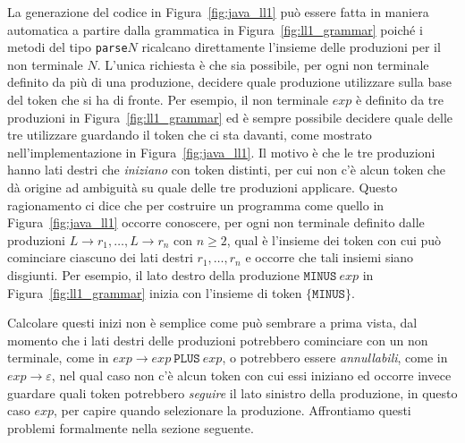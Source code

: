 La generazione del codice in Figura~\ref{fig:java_ll1} pu\`o essere
fatta in maniera automatica a partire dalla grammatica in
Figura~\ref{fig:ll1_grammar} poich\'e i metodi del tipo
\texttt{parse}$N$ ricalcano direttamente l'insieme delle produzioni
per il non terminale $N$. L'unica richiesta \`e che sia possibile,
per ogni non terminale definito da pi\`u di una produzione, decidere
quale produzione utilizzare sulla base del token che si ha di fronte.
Per esempio, il non terminale $\mathit{exp}$ \`e definito da tre
produzioni in Figura~\ref{fig:ll1_grammar} ed \`e sempre possibile
decidere quale delle tre utilizzare guardando il token che ci sta
davanti, come mostrato nell'implementazione in Figura~\ref{fig:java_ll1}.
Il motivo \`e che le tre produzioni hanno lati destri che \emph{iniziano} con
token distinti, per cui non c'\`e alcun token che d\`a origine ad
ambiguit\`a su quale delle tre produzioni applicare.
Questo ragionamento ci dice che per costruire un programma come quello
in Figura~\ref{fig:java_ll1} occorre conoscere, per ogni non terminale
definito dalle produzioni
$L\to r_1,\ldots,L\to r_n$ con $n\ge 2$, qual \`e l'insieme dei token con cui
pu\`o cominciare ciascuno dei lati destri $r_1,\ldots,r_n$ e occorre che tali
insiemi siano disgiunti. Per esempio,
il lato destro della produzione $\mathtt{MINUS}\ \mathit{exp}$ in
Figura~\ref{fig:ll1_grammar} inizia con l'insieme di token
$\{\mathtt{MINUS}\}$.

Calcolare questi inizi non \`e \cosi semplice
come pu\`o sembrare a prima vista, dal momento che i lati destri delle
produzioni potrebbero cominciare con un non terminale, come
in $\mathit{exp}\to\mathit{exp}\ \mathtt{PLUS}\ \mathit{exp}$,
o potrebbero essere \emph{annullabili}, come in $\mathit{exp}\to\varepsilon$,
nel qual caso non c'\`e alcun token con cui essi iniziano ed occorre
invece guardare quali token potrebbero \emph{seguire} il lato sinistro
della produzione, in questo caso $\mathit{exp}$, per capire quando
selezionare la produzione.
Affrontiamo questi problemi formalmente nella sezione seguente.
%
